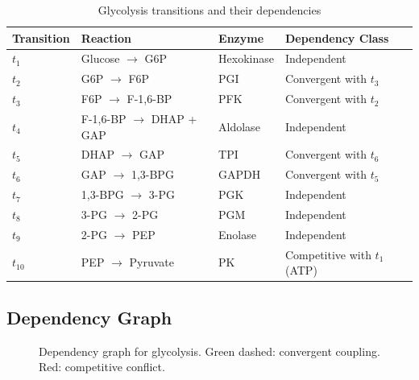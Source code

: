 \begin{table}[htbp]
\centering
\caption{Glycolysis transitions and their dependencies}
\label{tab:glycolysis-transitions}
\begin{tabular}{llll}
\toprule
\textbf{Transition} & \textbf{Reaction} & \textbf{Enzyme} & \textbf{Dependency Class} \\
\midrule
$t_1$ & Glucose $\to$ G6P & Hexokinase & Independent \\
$t_2$ & G6P $\to$ F6P & PGI & Convergent with $t_3$ \\
$t_3$ & F6P $\to$ F-1,6-BP & PFK & Convergent with $t_2$ \\
$t_4$ & F-1,6-BP $\to$ DHAP + GAP & Aldolase & Independent \\
$t_5$ & DHAP $\to$ GAP & TPI & Convergent with $t_6$ \\
$t_6$ & GAP $\to$ 1,3-BPG & GAPDH & Convergent with $t_5$ \\
$t_7$ & 1,3-BPG $\to$ 3-PG & PGK & Independent \\
$t_8$ & 3-PG $\to$ 2-PG & PGM & Independent \\
$t_9$ & 2-PG $\to$ PEP & Enolase & Independent \\
$t_{10}$ & PEP $\to$ Pyruvate & PK & Competitive with $t_1$ (ATP) \\
\bottomrule
\end{tabular}
\end{table}

\subsection{Dependency Graph}
\label{subsec:dependency-graph}

\begin{figure}[htbp]
\centering
{}
\caption{Dependency graph for glycolysis. Green dashed: convergent coupling. Red: competitive conflict.}
\label{fig:glycolysis-dependency-graph}
\end{figure}

